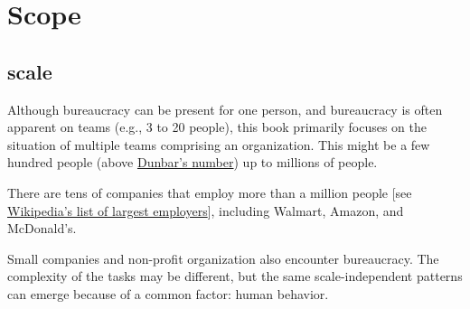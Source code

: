 \section{Scope}

\subsection{scale}
Although bureaucracy can be present for one person, and bureaucracy is often apparent on teams (e.g., 3 to 20 people), this book primarily focuses on the situation of multiple teams comprising an organization. This might be a few hundred people (above \href{https://en.wikipedia.org/wiki/Dunbar's_number}{Dunbar's number}) up to millions of people. 

There are tens of companies that employ more than a million people [see \href{https://en.wikipedia.org/wiki/List_of_largest_employers}{Wikipedia's list of largest employers}], including Walmart, Amazon, and McDonald's.

Small companies and non-profit organization also encounter bureaucracy. The complexity of the tasks may be different, but the same scale-independent patterns can emerge because of a common factor: human behavior.